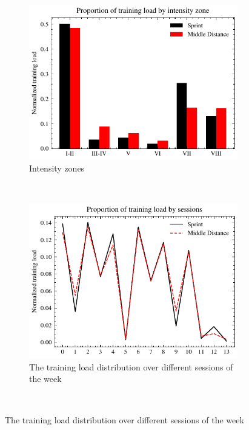 \begin{figure}[ht]
    \centering
    \begin{subfigure}[t]{0.48\textwidth}
        \centering
        \includegraphics[width=\textwidth]{chapters/figures/data_exploration/tl_by_intensity_spec.pdf}
        \captionsetup{width=.9\linewidth}
        \caption{Intensity zones}
    \end{subfigure}%
    ~ 
    \begin{subfigure}[t]{0.48\textwidth}
        \centering
        \includegraphics[width=\textwidth]{chapters/figures/data_exploration/tl_by_session_spec.pdf}
        \captionsetup{width=.9\linewidth}
        \caption{The training load distribution over different sessions of the week}
    \end{subfigure}\\[1ex]

\end{figure}
